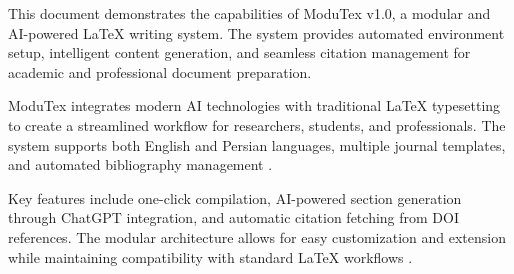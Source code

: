 This document demonstrates the capabilities of ModuTex v1.0, a modular and AI-powered LaTeX writing system. The system provides automated environment setup, intelligent content generation, and seamless citation management for academic and professional document preparation.

ModuTex integrates modern AI technologies with traditional LaTeX typesetting to create a streamlined workflow for researchers, students, and professionals. The system supports both English and Persian languages, multiple journal templates, and automated bibliography management \cite{fang2020fltrust}.
 
Key features include one-click compilation, AI-powered section generation through ChatGPT integration, and automatic citation fetching from DOI references. The modular architecture allows for easy customization and extension while maintaining compatibility with standard LaTeX workflows \cite{sample2023research}. 